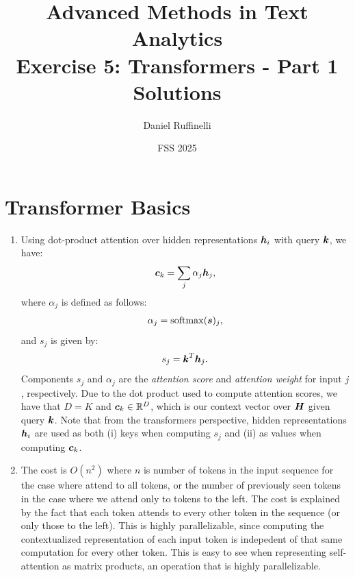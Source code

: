 \documentclass[11pt,a4paper]{article}
\title{Advanced Methods in Text Analytics \\ 
Exercise 5: Transformers - Part 1\\
\textbf{Solutions}}
\author{Daniel Ruffinelli}
\date{FSS 2025}
\begin{document}
\maketitle

\section{Transformer Basics}

\begin{enumerate}[label=(\alph*)]
    \item Using dot-product attention over hidden representations ${\boldsymbol{h}}_i$ with
          query ${\boldsymbol{k}}$, we have:
          \begin{align*}
              {\boldsymbol{c}}_k = \sum_j \alpha_j{\boldsymbol{h}}_j,
          \end{align*}
          where $\alpha_j$ is defined as follows:
          \begin{align*}
              \alpha_j = \operatorname{softmax}({\boldsymbol{s}})_j,
          \end{align*}
          and $s_j$ is given by:
          \begin{align*}
              s_j = {\boldsymbol{k}}^T{\boldsymbol{h}}_j.
          \end{align*}
          Components $s_j$ and $\alpha_j$ are the \emph{attention score} and
          \emph{attention weight} for input $j$, respectively.
          Due to the dot product used to compute attention scores, we have that
          $D = K$ and ${\boldsymbol{c}}_k\in\mathbb{R}^D$, which is our context vector over ${\boldsymbol{H}}$
          given query ${\boldsymbol{k}}$.
          Note that from the transformers perspective, hidden representations
          ${\boldsymbol{h}}_i$ are used as both (i) keys when computing $s_j$ and (ii) as
          values when computing ${\boldsymbol{c}}_k$.
    \item The cost is $O(n^2)$ where $n$ is number of tokens in the input
          sequence for the case where attend to all tokens, or the number of
          previously seen tokens in the case where we attend only to tokens to
          the left.
          The cost is explained by the fact that each token attends to every
          other token in the sequence (or only those to the left).
          This is highly parallelizable, since computing the contextualized
          representation of each input token is indepedent of that same
          computation for every other token.
          This is easy to see when representing self-attention as matrix
          products, an operation that is highly parallelizable.


\end{enumerate}
\end{document}
